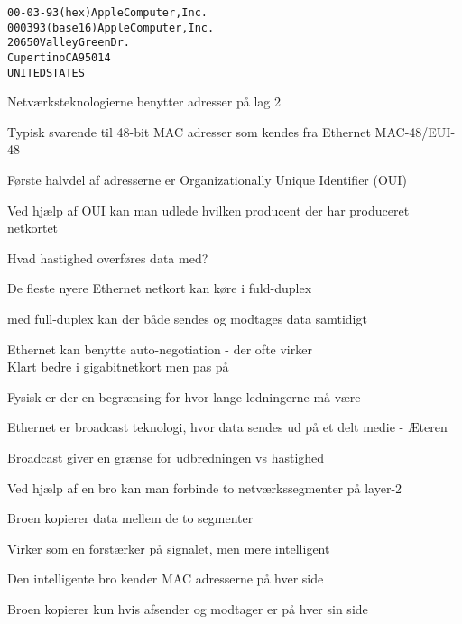 \documentclass[Screen16to9,17pt]{foils}
\begin{document}
\begin{alltt}
00-03-93   (hex)        Apple Computer, Inc.
000393     (base 16)    Apple Computer, Inc.
                        20650 Valley Green Dr.
                        Cupertino CA 95014
                        UNITED STATES
\end{alltt}
\begin{list1}
\item Netværksteknologierne benytter adresser på lag 2
\item Typisk svarende til 48-bit MAC adresser som kendes fra Ethernet MAC-48/EUI-48
\item Første halvdel af adresserne er Organizationally Unique Identifier (OUI)
\item Ved hjælp af OUI kan man udlede hvilken producent der har produceret netkortet
\item {}
\end{list1}



\begin{list1}
\item Hvad hastighed overføres data med?
\item De fleste nyere Ethernet netkort kan køre i fuld-duplex
\item med full-duplex kan der både sendes og modtages data samtidigt
\item Ethernet kan benytte auto-negotiation - der ofte virker\\
Klart bedre i gigabitnetkort men pas på
\end{list1}


\centerline{Fysisk er der en begrænsing for hvor lange ledningerne må være}


\begin{list1}
\item Ethernet er broadcast teknologi, hvor data sendes ud på et delt medie - Æteren
\item Broadcast giver en grænse for udbredningen vs hastighed
\item Ved hjælp af en bro kan man forbinde to netværkssegmenter på layer-2
\item Broen kopierer data mellem de to segmenter
\item Virker som en forstærker på signalet, men mere intelligent
\item Den intelligente bro kender MAC adresserne på hver side
\item Broen kopierer kun hvis afsender og modtager er på hver sin side
\end{list1}
\end{document}
